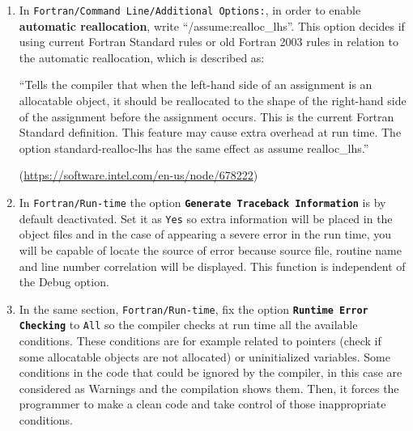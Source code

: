 \begin{enumerate}
    \item In \texttt{Fortran/Command Line/Additional Options:}, in order to enable \textbf{automatic reallocation}, write ``/assume:realloc\_lhs''. This option decides if using current Fortran Standard rules or old Fortran 2003 rules in relation to the automatic reallocation, which is described as:
    
    \begin{center}
        \begin{minipage}{0.7\linewidth}
            \vspace{5pt}
            {\small
                ``Tells the compiler that when the left-hand side of an assignment is an allocatable object, it should be reallocated to the shape of the right-hand side of the assignment before the assignment occurs. This is the current Fortran Standard definition. This feature may cause extra overhead at run time. The option standard-realloc-lhs has the same effect as assume realloc\_lhs.''
            }
            \begin{flushright}
                (\url{https://software.intel.com/en-us/node/678222})
            \end{flushright}
            \vspace{5pt}
        \end{minipage}
    \end{center}



    \item In \texttt{Fortran/Run-time} the option \textbf{\texttt{Generate Traceback Information}} is by default deactivated. Set it as \texttt{Yes} so extra information will be placed in the object files and in the case of appearing a severe error in the run time, you will be capable of locate the source of error because source file, routine name and line number correlation will be displayed. This function is independent of the Debug option.
    
    \item In the same section, \texttt{Fortran/Run-time}, fix the option \textbf{\texttt{Runtime Error Checking}} to \texttt{All} so the compiler checks at run time all the available conditions. These conditions are for example related to pointers (check if some allocatable objects are not allocated) or uninitialized variables. Some conditions in the code that could be ignored by the compiler, in this case are considered as Warnings and the compilation shows them. Then, it forces the programmer to make a clean code and take control of those inappropriate conditions. 
    

\end{enumerate}
